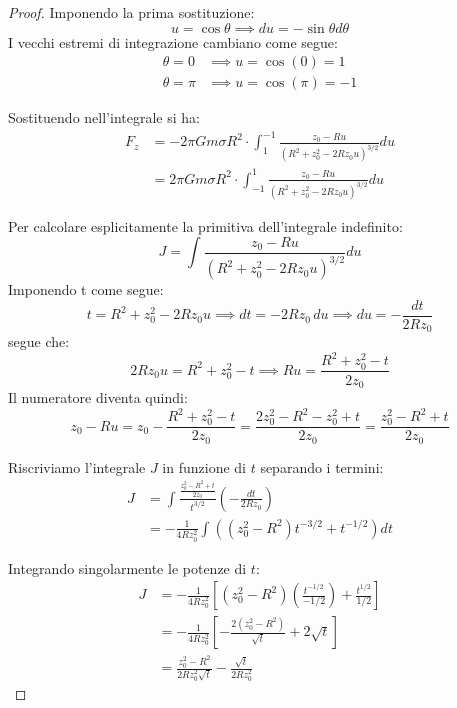 \documentclass[11pt]{article}
\theoremstyle{plain}
\begin{document}
\begin{proof}
    Imponendo la prima sostituzione:
    \begin{equation}
        u = \cos\theta \implies du = -\sin\theta d\theta
    \end{equation}
    I vecchi estremi di integrazione cambiano come segue:
    \begin{align}
        \theta = 0 & \implies u = \cos(0) = 1 \\
        \theta = \pi & \implies u = \cos(\pi) = -1 
    \end{align}

    Sostituendo nell'integrale si ha:
    \begin{align}
        F_z & = - 2\pi Gm\sigma R^2 \cdot \int_{1}^{-1} \frac{z_0 - Ru}{(R^2 + z_0^2 - 2Rz_0 u)^{3/2}}du \\
            & = 2\pi Gm\sigma R^2 \cdot \int_{-1}^{1} \frac{z_0 - Ru}{(R^2 + z_0^2 - 2Rz_0 u)^{3/2}}du 
    \end{align}

    Per calcolare esplicitamente la primitiva dell'integrale indefinito:
    \begin{equation}
        J = \int \frac{z_0 - Ru}{(R^2 + z_0^2 - 2Rz_0 u)^{3/2}}du
    \end{equation}
    Imponendo t come segue:
    \begin{equation}
        t = R^2 + z_0^2 - 2Rz_0 u \implies dt = -2Rz_0 \, du \implies du = -\frac{dt}{2Rz_0}
    \end{equation}
    segue che:
    \begin{equation}
        2Rz_0 u = R^2 + z_0^2 - t \implies Ru = \frac{R^2 + z_0^2 - t}{2z_0}
    \end{equation}
    Il numeratore diventa quindi:
    \begin{equation}
        z_0 - Ru = z_0 - \frac{R^2 + z_0^2 - t}{2z_0} = \frac{2z_0^2 - R^2 - z_0^2 + t}{2z_0} = \frac{z_0^2 - R^2 + t}{2z_0}
    \end{equation}

    Riscriviamo l'integrale $J$ in funzione di $t$ separando i termini:
    \begin{align}
        J & = \int \frac{\frac{z_0^2 - R^2 + t}{2z_0}}{t^{3/2}} \left( -\frac{dt}{2Rz_0} \right) \\
        & = -\frac{1}{4Rz_0^2} \int \left( (z_0^2 - R^2)t^{-3/2} + t^{-1/2} \right) dt
    \end{align}

    Integrando singolarmente le potenze di $t$:
    \begin{align}
        J & = -\frac{1}{4Rz_0^2} \left[ (z_0^2 - R^2) \left( \frac{t^{-1/2}}{-1/2} \right) + \frac{t^{1/2}}{1/2} \right] \\
        & = -\frac{1}{4Rz_0^2} \left[ -\frac{2(z_0^2 - R^2)}{\sqrt{t}} + 2\sqrt{t} \right] \\
        & = \frac{z_0^2 - R^2}{2Rz_0^2\sqrt{t}} - \frac{\sqrt{t}}{2Rz_0^2}
    \end{align}


\end{proof}
\end{document}
